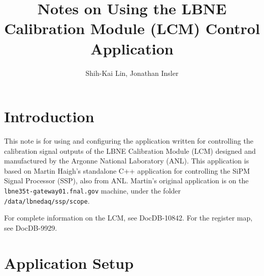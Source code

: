 \documentclass[12pt,a4paper,final]{iopart}
\begin{document}
\title[Notes on Using the LBNE Calibration Module (LCM) Control Application]{Notes on Using the LBNE Calibration Module (LCM) Control Application}

\author[cor1]{Shih-Kai Lin, Jonathan Insler}
\address{Colorado State University, Lousiana State University}


%


\section{Introduction}

This note is for using and configuring the application written for controlling the calibration signal outputs of the LBNE Calibration Module (LCM) designed and manufactured by the Argonne National Laboratory (ANL). This application is based on Martin Haigh's standalone C++ application for controlling the SiPM Signal Processor (SSP), also from ANL. Martin's original application is on the \texttt{lbne35t-gateway01.fnal.gov} machine, under the folder \texttt{/data/lbnedaq/ssp/scope}.

For complete information on the LCM, see DocDB-10842. For the register map, see DocDB-9929.

\section{Application Setup}
\end{document}

